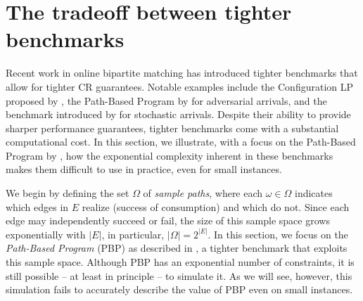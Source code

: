 {\section{The tradeoff between tighter benchmarks}

{Recent work in online bipartite matching has introduced tighter benchmarks that allow for tighter CR guarantees. Notable examples include the Configuration LP proposed by \citet{huang2020online}, the Path-Based Program by \citet{goyal2023online} for adversarial arrivals, and the benchmark introduced by \citet{brubach2020online} for stochastic arrivals.} Despite their ability to provide sharper performance guarantees, tighter benchmarks come with a substantial computational cost. In this section, we illustrate, with a focus on the Path-Based Program by \citet{goyal2023online}, how the exponential complexity inherent in these benchmarks makes them difficult to use in practice, even for small instances.

We begin by defining the set $\Omega$ of \emph{sample paths}, where each $\omega \in \Omega$ indicates which edges in $E$ realize (success of consumption) and which do not. Since each edge may independently succeed or fail, the size of this sample space grows exponentially with $|E|$, in particular, $|\Omega| = 2^{|E|}$. In this section, we focus on the \emph{Path-Based Program} (PBP) as described in \citet{goyal2023online}, a tighter benchmark that exploits this sample space. Although PBP has an exponential number of constraints, it is still possible -- at least in principle -- to simulate it. As we will see, however, this simulation fails to accurately describe the value of PBP even on small instances.

}
